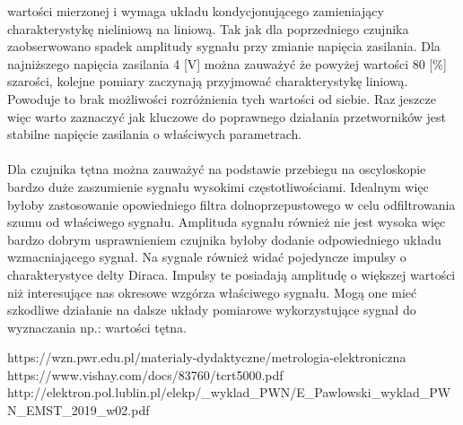 \documentclass[11pt]{article}
\begin{document}
    wartości mierzonej i wymaga układu kondycjonującego zamieniający charakterystykę nieliniową na liniową. Tak jak dla poprzedniego czujnika zaobserwowano spadek amplitudy
    sygnału przy zmianie napięcia zasilania. Dla najniższego napięcia zasilania 4 [V] można zauważyć że powyżej wartości 80 [\%] szarości, kolejne pomiary zaczynają
    przyjmować charakterystykę liniową. Powoduje to brak możliwości rozróżnienia tych wartości od siebie. Raz jeszcze więc warto zaznaczyć jak kluczowe do poprawnego działania
    przetworników jest stabilne napięcie zasilania o właściwych parametrach.\\
    \\
    \indent Dla czujnika tętna można zauważyć na podstawie przebiegu na oscyloskopie bardzo duże zaszumienie sygnału wysokimi częstotliwościami. Idealnym więc byłoby zastosowanie
    opowiedniego filtra dolnoprzepustowego w celu odfiltrowania szumu od właściwego sygnału. Amplituda sygnału również nie jest wysoka więc bardzo dobrym usprawnieniem czujnika
    byłoby dodanie odpowiedniego układu wzmacniającego sygnał. Na sygnale również widać pojedyncze impulsy o charakterystyce delty Diraca. Impulsy te posiadają amplitudę
    o większej wartości niż interesujące nas okresowe wzgórza właściwego sygnału. Mogą one mieć szkodliwe działanie na dalsze układy pomiarowe wykorzystujące sygnał do
    wyznaczania np.: wartości tętna.

    \vfill
    \footnotesize
    \begin{thebibliography}{3}
        https://wzn.pwr.edu.pl/materialy-dydaktyczne/metrologia-elektroniczna
        https://www.vishay.com/docs/83760/tcrt5000.pdf
        http://elektron.pol.lublin.pl/elekp/\_wyklad\_PWN/E\_Pawlowski\_wyklad\_PWN\_EMST\_2019\_w02.pdf
    \end{thebibliography}
\end{document}
